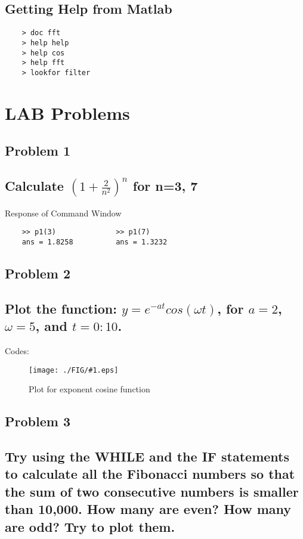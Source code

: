 \documentclass[a4paper,11pt]{article}
\newcommand\ddfrac[2]{\frac{\displaystyle #1}{\displaystyle #2}}
\newcommand{\mobs}[2]{
    \begin{figure}[H]
        \centering
        \texttt{[image: ./FIG/\#1.eps]}
        \caption{#2}
    \end{figure}
   
}
\begin{document}
\subsection{Getting Help from Matlab}
\begin{verbatim}
    > doc fft
    > help help
    > help cos
    > help fft
    > lookfor filter
\end{verbatim}


\section {LAB Problems}



\subsection{Problem 1}
\subsection*{Calculate $\left(1+\ddfrac{2}{n^2}\right)^n$ for n=3, 7}

Response of Command Window
\begin{verbatim}
    >> p1(3)              >> p1(7)
    ans = 1.8258          ans = 1.3232
\end{verbatim}

\subsection{Problem 2}
\subsection*{Plot the function: $y = e^{-at}cos (\omega t)$, for $a = 2$, $\omega = 5$, and $t = 0:10$.}
Codes:
\mobs{ecos}{Plot for exponent cosine function}


\subsection{Problem 3}
\subsection*{Try using the WHILE and the IF statements to calculate all the Fibonacci numbers so that the sum of two consecutive numbers is smaller than 10,000. How many are even? How many are odd? Try to plot them.}
\end{document}
